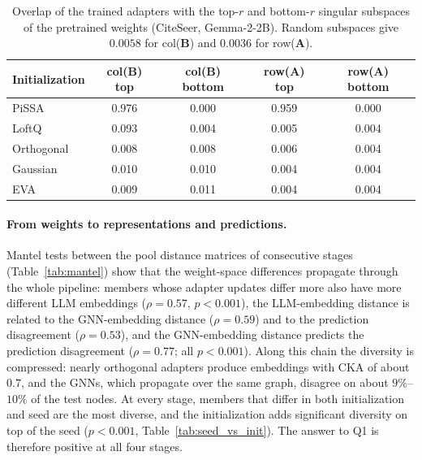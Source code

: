 \documentclass[a4paper,fleqn]{cas-sc}
\DeclareRobustCommand{\revcommon}[2][]{\textcolor{revshared}{#2}} %
\begin{document}
\begin{table}[htbp]
\centering\color{revshared}
\caption{Overlap of the trained adapters with the top-$r$ and bottom-$r$ singular subspaces of the pretrained weights (CiteSeer, Gemma-2-2B). Random subspaces give $0.0058$ for col($\mathbf{B}$) and $0.0036$ for row($\mathbf{A}$).}
\label{tab:spectral}
\small
\begin{tabular}{lcccc}
\toprule
\textbf{Initialization} & \textbf{col($\mathbf{B}$) top} & \textbf{col($\mathbf{B}$) bottom} & \textbf{row($\mathbf{A}$) top} & \textbf{row($\mathbf{A}$) bottom} \\
\midrule
PiSSA      & 0.976 & 0.000 & 0.959 & 0.000 \\
LoftQ      & 0.093 & 0.004 & 0.005 & 0.004 \\
Orthogonal & 0.008 & 0.008 & 0.006 & 0.004 \\
Gaussian   & 0.010 & 0.010 & 0.004 & 0.004 \\
EVA        & 0.009 & 0.011 & 0.004 & 0.004 \\
\bottomrule
\end{tabular}
\end{table}

\paragraph{\revcommon{From weights to representations and predictions.}}
\revcommon[R1,R2,R4]{Mantel tests \citep{mantel1967} between the pool distance matrices of consecutive stages (Table~\ref{tab:mantel}) show that the weight-space differences propagate through the whole pipeline: members whose adapter updates differ more also have more different LLM embeddings ($\rho=0.57$, $p<0.001$), the LLM-embedding distance is related to the GNN-embedding distance ($\rho=0.59$) and to the prediction disagreement ($\rho=0.53$), and the GNN-embedding distance predicts the prediction disagreement ($\rho=0.77$; all $p<0.001$). Along this chain the diversity is compressed: nearly orthogonal adapters produce embeddings with CKA of about $0.7$, and the GNNs, which propagate over the same graph, disagree on about $9\%$--$10\%$ of the test nodes.} \revcommon[R1,R2,R4]{At every stage, members that differ in both initialization and seed are the most diverse, and the initialization adds significant diversity on top of the seed ($p<0.001$, Table~\ref{tab:seed_vs_init}). The answer to Q1 is therefore positive at all four stages.}
\end{document}
